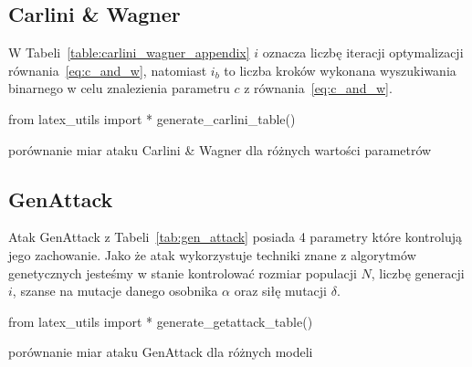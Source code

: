 \documentclass[
    left=2.5cm,         %
    right=2.5cm,        %
    top=2.5cm,          %
    bottom=3cm,         %
    bindingoffset=6mm,  %
    nohyphenation=false %
]{eiti/eiti-thesis}
\begin{document}
\subsection{Carlini \& Wagner}
W Tabeli~\ref{table:carlini_wagner_appendix} $i$ oznacza liczbę iteracji optymalizacji równania~\eqref{eq:c_and_w},
natomiast $i_b$ to liczba kroków wykonana wyszukiwania binarnego w celu znalezienia parametru $c$ z równania~\eqref{eq:c_and_w}.
\begin{table}[H]
\begin{adjustbox}{max width=\textwidth}
\begin{pycode}
from latex_utils import *
generate_carlini_table()
\end{pycode}
\end{adjustbox}
\caption{porównanie miar ataku Carlini \& Wagner dla różnych wartości parametrów}
\label{table:carlini_wagner_appendix}
\end{table}

\subsection{GenAttack}
Atak GenAttack z Tabeli~\ref{tab:gen_attack} posiada 4 parametry które kontrolują jego zachowanie. Jako że atak wykorzystuje techniki
znane z algorytmów genetycznych jesteśmy w stanie kontrolować rozmiar populacji $N$, liczbę generacji $i$, szanse na mutacje
danego osobnika $\alpha$ oraz siłę mutacji $\delta$.
\begin{table}[H]
\begin{adjustbox}{max width=\textwidth}
\begin{pycode}
from latex_utils import *
generate_getattack_table()
\end{pycode}
\end{adjustbox}
\caption{porównanie miar ataku GenAttack dla różnych modeli}
\label{tab:gen_attack}
\end{table}
\end{document}

